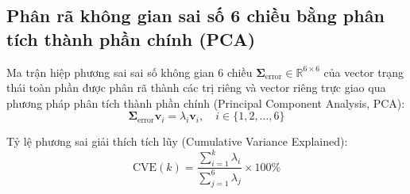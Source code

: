 \subsection{Phân rã không gian sai số 6 chiều bằng phân tích thành phần chính (PCA)}

\hspace{0.5cm} Ma trận hiệp phương sai sai số không gian 6 chiều $\boldsymbol{\Sigma}_{\text{error}} \in \mathbb{R}^{6 \times 6}$ của vector trạng thái toàn phần được phân rã thành các trị riêng và vector riêng trực giao qua phương pháp phân tích thành phần chính (Principal Component Analysis, PCA):
\begin{equation}
\boldsymbol{\Sigma}_{\text{error}} \mathbf{v}_i = \lambda_i \mathbf{v}_i, \quad i \in \{1, 2, \dots, 6\}
\label{eq:pca-eigenvalue-equation}
\end{equation}

Tỷ lệ phương sai giải thích tích lũy (Cumulative Variance Explained):
\begin{equation}
\text{CVE}(k) = \frac{\sum_{i=1}^k \lambda_i}{\sum_{j=1}^6 \lambda_j} \times 100\%
\label{eq:cumulative-variance-explained-formula}
\end{equation}

\begin{table}[H]
\centering
\caption{Phân tích các thành phần chính của sai số bám bắt trong không gian trạng thái 6 chiều}
\label{tab:pca-error-decomposition-table}
\end{table}

